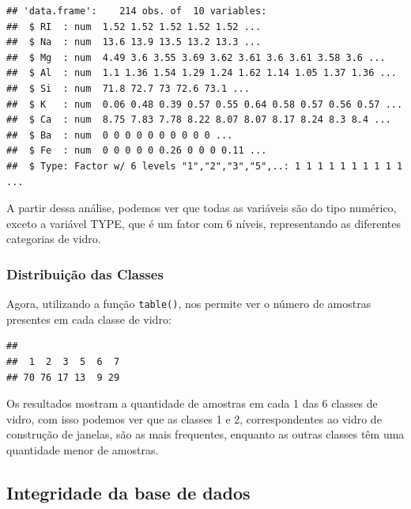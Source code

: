 \documentclass[
]{article}
\newenvironment{Shaded}{\begin{snugshade}}{\end{snugshade}}
\newcommand{\FunctionTok}[1]{\textcolor[rgb]{0.13,0.29,0.53}{\textbf{#1}}}
\newcommand{\NormalTok}[1]{#1}
\newcommand{\SpecialCharTok}[1]{\textcolor[rgb]{0.81,0.36,0.00}{\textbf{#1}}}
\begin{document}
\begin{verbatim}
## 'data.frame':    214 obs. of  10 variables:
##  $ RI  : num  1.52 1.52 1.52 1.52 1.52 ...
##  $ Na  : num  13.6 13.9 13.5 13.2 13.3 ...
##  $ Mg  : num  4.49 3.6 3.55 3.69 3.62 3.61 3.6 3.61 3.58 3.6 ...
##  $ Al  : num  1.1 1.36 1.54 1.29 1.24 1.62 1.14 1.05 1.37 1.36 ...
##  $ Si  : num  71.8 72.7 73 72.6 73.1 ...
##  $ K   : num  0.06 0.48 0.39 0.57 0.55 0.64 0.58 0.57 0.56 0.57 ...
##  $ Ca  : num  8.75 7.83 7.78 8.22 8.07 8.07 8.17 8.24 8.3 8.4 ...
##  $ Ba  : num  0 0 0 0 0 0 0 0 0 0 ...
##  $ Fe  : num  0 0 0 0 0 0.26 0 0 0 0.11 ...
##  $ Type: Factor w/ 6 levels "1","2","3","5",..: 1 1 1 1 1 1 1 1 1 1 ...
\end{verbatim}

A partir dessa análise, podemos ver que todas as variáveis são do tipo
numérico, exceto a variável TYPE, que é um fator com 6 níveis,
representando as diferentes categorias de vidro.

\subsubsection{Distribuição das
Classes}\label{distribuiuxe7uxe3o-das-classes}

Agora, utilizando a função \texttt{table()}, nos permite ver o número de
amostras presentes em cada classe de vidro:

\begin{Shaded}
\end{Shaded}

\begin{verbatim}
## 
##  1  2  3  5  6  7 
## 70 76 17 13  9 29
\end{verbatim}

Os resultados mostram a quantidade de amostras em cada 1 das 6 classes
de vidro, com isso podemos ver que as classes 1 e 2, correspondentes ao
vidro de construção de janelas, são as mais frequentes, enquanto as
outras classes têm uma quantidade menor de amostras.

\subsection{\texorpdfstring{Integridade da base de dados
}{Integridade da base de dados }}\label{integridade-da-base-de-dados}
\end{document}
